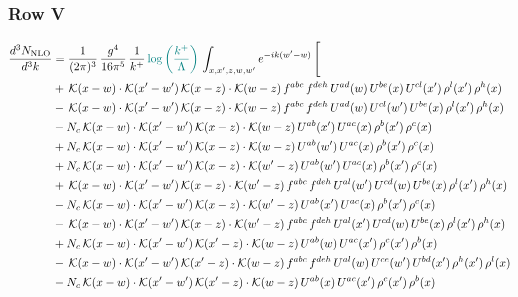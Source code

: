 \documentclass[9pt]{article}
\numberwithin{equation}{section}
\begin{document}
\subsubsection{Row V}
\begin{align}
\frac{d^{3}N_{\mathrm{NLO}}}{d^{3}k} & = \frac{1}{(2\pi)^{3}}\,\frac{g^{4}}{16\pi^{5}}\,\frac{1}{k^{+}}\,{\color{teal}\log{\left(\frac{k^{+}}{\Lambda}\right)}}\,\int_{x,x',z,w,w'}e^{-ik(w'-w)}\,\Bigg[\notag\\ &  +\,\mathcal{K}(x-w)\cdot\mathcal{K}(x'-w')\,\mathcal{K}(x-z)\cdot\mathcal{K}(w-z)\,f^{abc}\,f^{deh}\,U^{ad}(w)\,U^{be}(x)\,U^{cl}(x')\,\rho^{l}(x')\,\rho^{h}(x)\notag\\
& -\,\mathcal{K}(x-w)\cdot\mathcal{K}(x'-w')\,\mathcal{K}(x-z)\cdot\mathcal{K}(w-z)\,f^{abc}\,f^{deh}\,U^{ad}(w)\,U^{cl}(w')\,U^{be}(x)\,\rho^{l}(x')\,\rho^{h}(x)\notag\\
& -N_{c}\,\mathcal{K}(x-w)\cdot\mathcal{K}(x'-w')\,\mathcal{K}(x-z)\cdot\mathcal{K}(w-z)\,U^{ab}(x')\,U^{ac}(x)\,\rho^{b}(x')\,\rho^{c}(x)\notag\\
& +N_{c}\,\mathcal{K}(x-w)\cdot\mathcal{K}(x'-w')\,\mathcal{K}(x-z)\cdot\mathcal{K}(w-z)\,U^{ab}(w')\,U^{ac}(x)\,\rho^{b}(x')\,\rho^{c}(x)\notag\\
& +N_{c}\,\mathcal{K}(x-w)\cdot\mathcal{K}(x'-w')\,\mathcal{K}(x-z)\cdot\mathcal{K}(w'-z)\,U^{ab}(w')\,U^{ac}(x)\,\rho^{b}(x')\,\rho^{c}(x)\notag\\
& +\,\mathcal{K}(x-w)\cdot\mathcal{K}(x'-w')\,\mathcal{K}(x-z)\cdot\mathcal{K}(w'-z)\,f^{abc}\,f^{deh}\,U^{al}(w')\,U^{cd}(w)\,U^{be}(x)\,\rho^{l}(x')\,\rho^{h}(x)\notag\\
& -N_{c}\,\mathcal{K}(x-w)\cdot\mathcal{K}(x'-w')\,\mathcal{K}(x-z)\cdot\mathcal{K}(w'-z)\,U^{ab}(x')\,U^{ac}(x)\,\rho^{b}(x')\,\rho^{c}(x)\notag\\
& -\,\mathcal{K}(x-w)\cdot\mathcal{K}(x'-w')\,\mathcal{K}(x-z)\cdot\mathcal{K}(w'-z)\,f^{abc}\,f^{deh}\,U^{al}(x')\,U^{cd}(w)\,U^{be}(x)\,\rho^{l}(x')\,\rho^{h}(x)\notag\\
& +N_{c}\,\mathcal{K}(x-w)\cdot\mathcal{K}(x'-w')\,\mathcal{K}(x'-z)\cdot\mathcal{K}(w-z)\,U^{ab}(w)\,U^{ac}(x')\,\rho^{c}(x')\,\rho^{b}(x)\notag\\
& -\,\mathcal{K}(x-w)\cdot\mathcal{K}(x'-w')\,\mathcal{K}(x'-z)\cdot\mathcal{K}(w-z)\,f^{abc}\,f^{deh}\,U^{al}(w)\,U^{ce}(w')\,U^{bd}(x')\,\rho^{h}(x')\,\rho^{l}(x)\notag\\
& -N_{c}\,\mathcal{K}(x-w)\cdot\mathcal{K}(x'-w')\,\mathcal{K}(x'-z)\cdot\mathcal{K}(w-z)\,U^{ab}(x)\,U^{ac}(x')\,\rho^{c}(x')\,\rho^{b}(x)\notag\\

\end{align}
\end{document}
